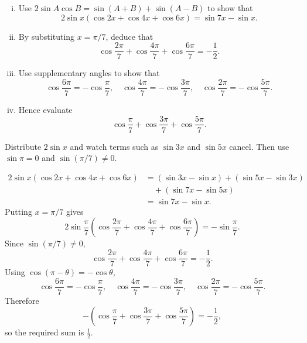 
\begin{problem}
\begin{enumerate}[(i)]
  \item Use $2\sin A\cos B=\sin(A+B)+\sin(A-B)$ to show that
  \[
  2\sin x(\cos2x+\cos4x+\cos6x)=\sin7x-\sin x.
  \]
  \item By substituting $x=\pi/7$, deduce that
  \[
  \cos\frac{2\pi}{7}+\cos\frac{4\pi}{7}+\cos\frac{6\pi}{7}
  =-\frac12.
  \]
  \item Use supplementary angles to show that
  \[
  \cos\frac{6\pi}{7}=-\cos\frac{\pi}{7},\quad
  \cos\frac{4\pi}{7}=-\cos\frac{3\pi}{7},\quad
  \cos\frac{2\pi}{7}=-\cos\frac{5\pi}{7}.
  \]
  \item Hence evaluate
  \[
  \cos\frac{\pi}{7}+\cos\frac{3\pi}{7}+\cos\frac{5\pi}{7}.
  \]
\end{enumerate}
\end{problem}

\begin{hintbox}
Distribute $2\sin x$ and watch terms such as $\sin3x$ and $\sin5x$ cancel.
Then use $\sin\pi=0$ and $\sin(\pi/7)\ne0$.
\end{hintbox}

\begin{solution}
\[
\begin{aligned}
2\sin x(\cos2x+\cos4x+\cos6x)
&=(\sin3x-\sin x)+(\sin5x-\sin3x)\\
&\quad+(\sin7x-\sin5x)\\
&=\sin7x-\sin x.
\end{aligned}
\]
Putting $x=\pi/7$ gives
\[
2\sin\frac{\pi}{7}
\left(
\cos\frac{2\pi}{7}+\cos\frac{4\pi}{7}+\cos\frac{6\pi}{7}
\right)
=-\sin\frac{\pi}{7}.
\]
Since $\sin(\pi/7)\ne0$,
\[
\cos\frac{2\pi}{7}+\cos\frac{4\pi}{7}+\cos\frac{6\pi}{7}
=-\frac12.
\]
Using $\cos(\pi-\theta)=-\cos\theta$,
\[
\cos\frac{6\pi}{7}=-\cos\frac{\pi}{7},
\quad
\cos\frac{4\pi}{7}=-\cos\frac{3\pi}{7},
\quad
\cos\frac{2\pi}{7}=-\cos\frac{5\pi}{7}.
\]
Therefore
\[
-\left(
\cos\frac{\pi}{7}+\cos\frac{3\pi}{7}+\cos\frac{5\pi}{7}
\right)
=-\frac12,
\]
so the required sum is $\frac12$.
\end{solution}

